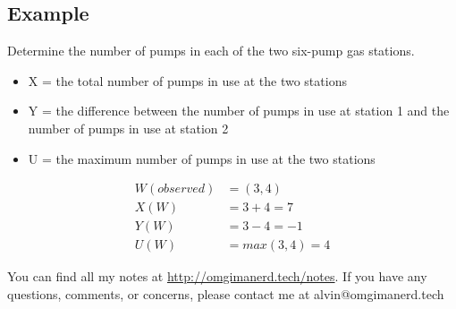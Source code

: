\documentclass{math}
\begin{document}
\subsection*{Example}
Determine the number of pumps in each of the two six-pump gas stations.
\begin{itemize}
  \item X = the total number of pumps in use at the two stations
  \item Y = the difference between the number of pumps in use at station 1 and
    the number of pumps in use at station 2
  \item U = the maximum number of pumps in use at the two stations
\end{itemize}
\begin{align*}
  W(observed) &= (3,4) \\
  X(W) &= 3+4 = 7 \\
  Y(W) &= 3-4 = -1 \\
  U(W) &= max(3,4) = 4
\end{align*}

\begin{center}
  You can find all my notes at \url{http://omgimanerd.tech/notes}. If you have
  any questions, comments, or concerns, please contact me at
  alvin@omgimanerd.tech
\end{center}
\end{document}
